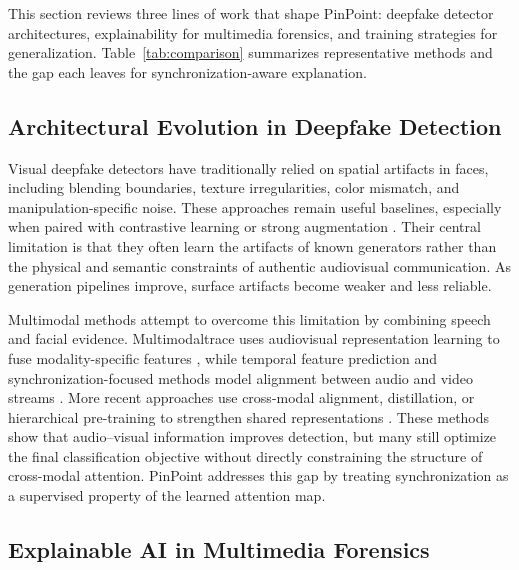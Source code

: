 \documentclass[pdflatex,sn-mathphys-num]{sn-jnl}
\begin{document}
This section reviews three lines of work that shape PinPoint: deepfake detector architectures, explainability for multimedia forensics, and training strategies for generalization. Table~\ref{tab:comparison} summarizes representative methods and the gap each leaves for synchronization-aware explanation.


\subsection{Architectural Evolution in Deepfake Detection}\label{sec2.1}

Visual deepfake detectors have traditionally relied on spatial artifacts in faces, including blending boundaries, texture irregularities, color mismatch, and manipulation-specific noise. These approaches remain useful baselines, especially when paired with contrastive learning or strong augmentation \cite{ref3}. Their central limitation is that they often learn the artifacts of known generators rather than the physical and semantic constraints of authentic audiovisual communication. As generation pipelines improve, surface artifacts become weaker and less reliable.

Multimodal methods attempt to overcome this limitation by combining speech and facial evidence. Multimodaltrace uses audiovisual representation learning to fuse modality-specific features \cite{ref1}, while temporal feature prediction and synchronization-focused methods model alignment between audio and video streams \cite{ref2,ref5}. More recent approaches use cross-modal alignment, distillation, or hierarchical pre-training to strengthen shared representations \cite{ref7,ref11,ref12}. These methods show that audio--visual information improves detection, but many still optimize the final classification objective without directly constraining the structure of cross-modal attention. PinPoint addresses this gap by treating synchronization as a supervised property of the learned attention map.


\subsection{Explainable AI in Multimedia Forensics}\label{sec2.2}
\end{document}
